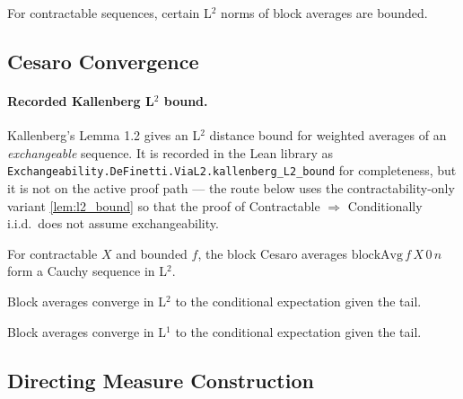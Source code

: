 \begin{lemma}
  \label{lem:l2_bound}
  \leanok
  For contractable sequences, certain L$^2$ norms of block averages are bounded.
\end{lemma}

\subsection{Cesaro Convergence}

\paragraph{Recorded Kallenberg L$^2$ bound.}
Kallenberg's Lemma 1.2 gives an L$^2$ distance bound for weighted averages of an
\emph{exchangeable} sequence. It is recorded in the Lean library as
\texttt{Exchangeability.DeFinetti.ViaL2.kallenberg\_L2\_bound} for completeness, but it
is not on the active proof path — the route below uses the contractability-only
variant \ref{lem:l2_bound} so that the proof of Contractable $\Rightarrow$
Conditionally i.i.d.\ does not assume exchangeability.

\begin{lemma}
  \label{lem:blockAvg_cauchy_in_L2}
  \leanok
  For contractable $X$ and bounded $f$, the block Cesaro averages
  $\mathrm{blockAvg}\, f\, X\, 0\, n$ form a Cauchy sequence in L$^2$.
\end{lemma}

\begin{lemma}
  \label{lem:cesaro_L2}
  \leanok
  Block averages converge in L$^2$ to the conditional expectation given the tail.
\end{lemma}

\begin{lemma}
  \label{lem:cesaro_L1}
  \leanok
  Block averages converge in L$^1$ to the conditional expectation given the tail.
\end{lemma}

\subsection{Directing Measure Construction}

